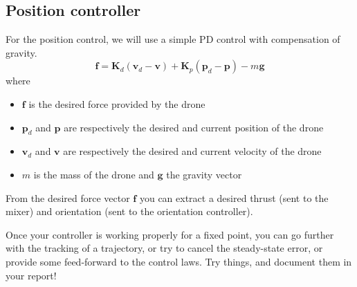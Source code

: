 \documentclass[a4paper]{article}
\begin{document}
\subsection{Position controller}
For the position control, we will use a simple PD control with compensation of gravity.
%
\begin{equation}
	\mathbf{f} = \mathbf{K}_d (\mathbf{v}_d - \mathbf{v}) + \mathbf{K}_p (\mathbf{p}_d - \mathbf{p}) - m\mathbf{g}
\end{equation}
%
where 
\begin{itemize}
	\item $\mathbf{f}$ is the desired force provided by the drone
	\item $\mathbf{p}_d$ and $\mathbf{p}$ are respectively the desired and current position of the drone
	\item $\mathbf{v}_d$ and $\mathbf{v}$ are respectively the desired and current velocity of the drone
	\item $m$ is the mass of the drone and $\mathbf{g}$ the gravity vector
\end{itemize}
%
From the desired force vector $\mathbf{f}$ you can extract a desired thrust (sent to the mixer) and orientation (sent to the orientation controller).

Once your controller is working properly for a fixed point, you can go further with the tracking of a trajectory, or try to cancel the steady-state error, or provide some feed-forward to the control laws. Try things, and document them in your report!
\end{document}
